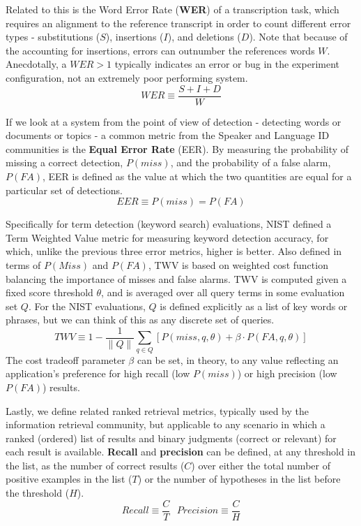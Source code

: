 Related to this is the Word Error Rate (\textbf{WER}) of a transcription task, which requires an alignment to the reference transcript in order to count different error types -  substitutions ($S$), insertions ($I$), and deletions ($D$).  Note that because of the accounting for insertions, errors can outnumber the references words $W$.  Anecdotally, a $WER>1$ typically indicates an error or bug in the experiment configuration, not an extremely poor performing system.
\begin{equation}
WER \equiv \frac{S + I + D}{W}
\end{equation}

If we look at a system from the point of view of detection - detecting words or documents or topics - a common metric from the Speaker and Language ID communities is the \textbf{Equal Error Rate} (EER).  By measuring the probability of missing a correct detection, $P(miss)$, and the probability of a false alarm, $P(FA)$, EER is defined as the value at which the two quantities are equal for a particular set of detections.
\begin{equation}
EER \equiv P(miss) = P(FA)
\end{equation}

Specifically for term detection (keyword search) evaluations, NIST defined a Term Weighted Value metric for measuring keyword detection accuracy, for which, unlike the previous three error metrics, higher is better.   Also defined in terms of $P(Miss)$ and $P(FA)$, TWV is based on weighted cost function balancing the importance of misses and false alarms.  TWV is computed given a fixed score threshold $\theta$, and is averaged over all query terms in some evaluation set $Q$.  For the NIST evaluations, $Q$ is defined explicitly as a list of key words or phrases, but we can think of this as any discrete set of queries. 
\begin{equation}
TWV \equiv 1 - \frac{1}{\|Q\|}\sum_{q\in Q}\left[P(miss, q, \theta) + \beta \cdot P(FA, q, \theta)\right]
\end{equation}
The cost tradeoff parameter $\beta$ can be set, in theory, to any value reflecting an application's preference for high recall (low $P(miss)$) or high precision (low $P(FA)$) results.

Lastly, we define related ranked retrieval metrics, typically used by the information retrieval community, but applicable to any scenario in which a ranked (ordered) list of results and binary judgments (correct or relevant) for each result is available.   \textbf{Recall} and \textbf{precision} can be defined, at any threshold in the list, as the number of correct results ($C$) over either the total number of positive examples in the list ($T$) or the number of hypotheses in the list before the threshold ($H$).
\begin{equation}
Recall \equiv \frac{C}{T}\,\,\,\, Precision \equiv \frac{C}{H}
\end{equation}

